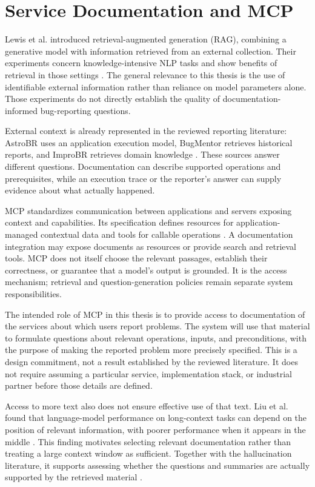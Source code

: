 \section{Service Documentation and MCP}

Lewis et al. introduced retrieval-augmented generation (RAG), combining a generative model with information retrieved from an external collection. Their experiments concern knowledge-intensive NLP tasks and show benefits of retrieval in those settings \cite{lewis2020}. The general relevance to this thesis is the use of identifiable external information rather than reliance on model parameters alone. Those experiments do not directly establish the quality of documentation-informed bug-reporting questions.

External context is already represented in the reviewed reporting literature: AstroBR uses an application execution model, BugMentor retrieves historical reports, and ImproBR retrieves domain knowledge \cite{mahmud2025,bugmentor2026,akyol2026}. These sources answer different questions. Documentation can describe supported operations and prerequisites, while an execution trace or the reporter's answer can supply evidence about what actually happened.

MCP standardizes communication between applications and servers exposing context and capabilities. Its specification defines resources for application-managed contextual data and tools for callable operations \cite{mcp2025resources,mcp2025tools}. A documentation integration may expose documents as resources or provide search and retrieval tools. MCP does not itself choose the relevant passages, establish their correctness, or guarantee that a model's output is grounded. It is the access mechanism; retrieval and question-generation policies remain separate system responsibilities.

The intended role of MCP in this thesis is to provide access to documentation of the services about which users report problems. The system will use that material to formulate questions about relevant operations, inputs, and preconditions, with the purpose of making the reported problem more precisely specified. This is a design commitment, not a result established by the reviewed literature. It does not require assuming a particular service, implementation stack, or industrial partner before those details are defined.

Access to more text also does not ensure effective use of that text. Liu et al. found that language-model performance on long-context tasks can depend on the position of relevant information, with poorer performance when it appears in the middle \cite{liu2024}. This finding motivates selecting relevant documentation rather than treating a large context window as sufficient. Together with the hallucination literature, it supports assessing whether the questions and summaries are actually supported by the retrieved material \cite{ji2023}.


